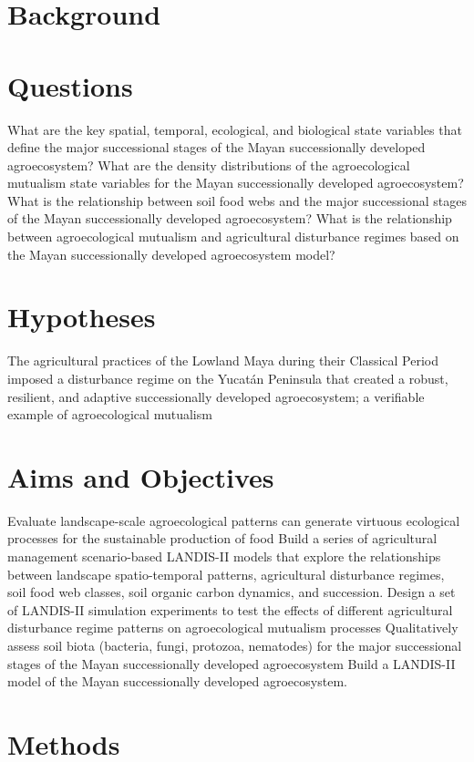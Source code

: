 
\section{Background}

\section{Questions}
\begin{outline}
\1 What are the key spatial, temporal, ecological, and biological state variables that define the major successional stages of the Mayan successionally developed agroecosystem?
\1 What are the density distributions of the agroecological mutualism state variables for the Mayan successionally developed agroecosystem?
\1 What is the relationship between soil food webs and the major successional stages of the Mayan successionally developed agroecosystem?
\1 What is the relationship between agroecological mutualism and agricultural disturbance regimes based on the Mayan successionally developed agroecosystem model?
\end{outline}



\section{Hypotheses}
\begin{outline}
\1 The agricultural practices of the Lowland Maya during their Classical Period imposed a disturbance regime on the Yucat\'{a}n Peninsula that created a robust, resilient, and adaptive successionally developed agroecosystem; a verifiable example of agroecological mutualism


\end{outline}


\section{Aims and Objectives}
\begin{outline}
\1 Evaluate landscape-scale agroecological patterns can generate virtuous ecological processes for the sustainable production of food
\1 Build a series of agricultural management scenario-based LANDIS-II models that explore the relationships between landscape spatio-temporal patterns, agricultural disturbance regimes, soil food web classes, soil organic carbon dynamics, and succession.
\1 Design a set of LANDIS-II simulation experiments to test the effects of different agricultural disturbance regime patterns on agroecological mutualism processes
\1 Qualitatively assess soil biota (bacteria, fungi, protozoa, nematodes) for the major successional stages of the Mayan successionally developed agroecosystem
\1 Build a LANDIS-II model of the Mayan successionally developed agroecosystem.

\end{outline}



\section{Methods}
